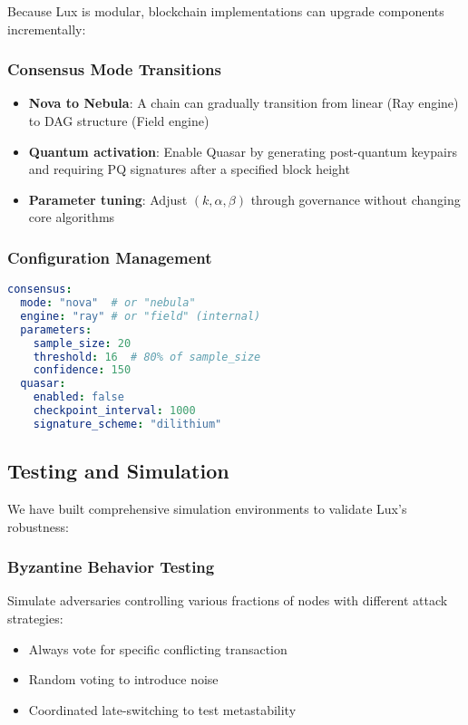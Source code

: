 Because Lux is modular, blockchain implementations can upgrade components incrementally:

\subsubsection{Consensus Mode Transitions}

\begin{itemize}
\item \textbf{Nova to Nebula}: A chain can gradually transition from linear (Ray engine) to DAG structure (Field engine)

\item \textbf{Quantum activation}: Enable Quasar by generating post-quantum keypairs and requiring PQ signatures after a specified block height

\item \textbf{Parameter tuning}: Adjust $(k, \alpha, \beta)$ through governance without changing core algorithms
\end{itemize}

\subsubsection{Configuration Management}

\begin{lstlisting}[language=YAML]
consensus:
  mode: "nova"  # or "nebula" 
  engine: "ray" # or "field" (internal)
  parameters:
    sample_size: 20
    threshold: 16  # 80% of sample_size
    confidence: 150
  quasar:
    enabled: false
    checkpoint_interval: 1000
    signature_scheme: "dilithium"
\end{lstlisting}

\subsection{Testing and Simulation}

We have built comprehensive simulation environments to validate Lux's robustness:

\subsubsection{Byzantine Behavior Testing}

Simulate adversaries controlling various fractions of nodes with different attack strategies:
\begin{itemize}
\item Always vote for specific conflicting transaction
\item Random voting to introduce noise
\item Coordinated late-switching to test metastability
\end{itemize}

